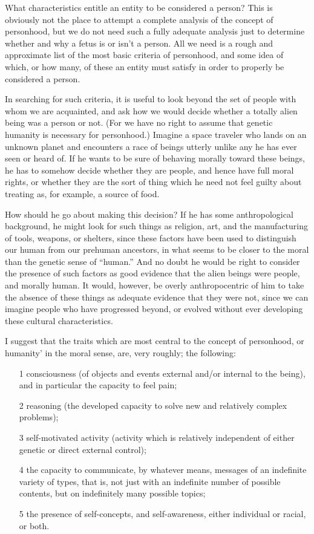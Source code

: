 What characteristics entitle an entity to be considered a
person? This is obviously not the place to attempt a
complete analysis of the concept of personhood, but we
do not need such a fully adequate analysis just to
determine whether and why a fetus is or isn’t a person.
All we need is a rough and approximate list of the most
basic criteria of personhood, and some idea of which, or
how many, of these an entity must satisfy in order to
properly be considered a person.

In searching for such criteria, it is useful to look beyond
the set of people with whom we are acquainted, and ask
how we would decide whether a totally alien being was a
person or not. (For we have no right to assume that
genetic humanity is necessary for personhood.) Imagine a
space traveler who lands on an unknown planet and
encounters a race of beings utterly unlike any he has ever
seen or heard of. If he wants to be sure of behaving
morally toward these beings, he has to somehow decide
whether they are people, and hence have full moral rights,
or whether they are the sort of thing which he need not
feel guilty about treating as, for example, a source of
food.

How should he go about making this decision? If he has
some anthropological background, he might look for such
things as religion, art, and the manufacturing of tools,
weapons, or shelters, since these factors have been used to
distinguish our human from our prehuman ancestors, in
what seems to be closer to the moral than the genetic
sense of ``human.” And no doubt he would be right to
consider the presence of such factors as good evidence
that the alien beings were people, and morally human. It
would, however, be overly anthropocentric of him to take
the absence of these things as adequate evidence that they
were not, since we can imagine people who have
progressed beyond, or evolved without ever developing
these cultural characteristics.

I suggest that the traits which are most central to the
concept of personhood, or humanity’ in the moral sense,
are, very roughly; the following:

\begin{enumerate}
\item[1] consciousness (of objects and events external
and/or internal to the being), and in particular the
capacity to feel pain;
\item[2] reasoning (the developed capacity to solve new and
relatively complex problems);
\item[3] self-motivated activity (activity which is relatively
independent of either genetic or direct external
control);
\item[4] the capacity to communicate, by whatever means,
messages of an indefinite variety of types, that is, not
just with an indefinite number of possible contents,
but on indefinitely many possible topics;
\item[5] the presence of self-concepts, and self-awareness,
either individual or racial, or both.
\end{enumerate}

